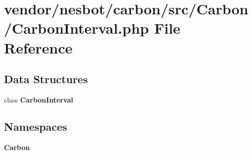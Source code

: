 \section{vendor/nesbot/carbon/src/\+Carbon/\+Carbon\+Interval.php File Reference}
\label{_carbon_interval_8php}
\subsection*{Data Structures}
\begin{DoxyCompactItemize}
\item 
class {\bf Carbon\+Interval}
\end{DoxyCompactItemize}
\subsection*{Namespaces}
\begin{DoxyCompactItemize}
\item 
 {\bf Carbon}
\end{DoxyCompactItemize}
